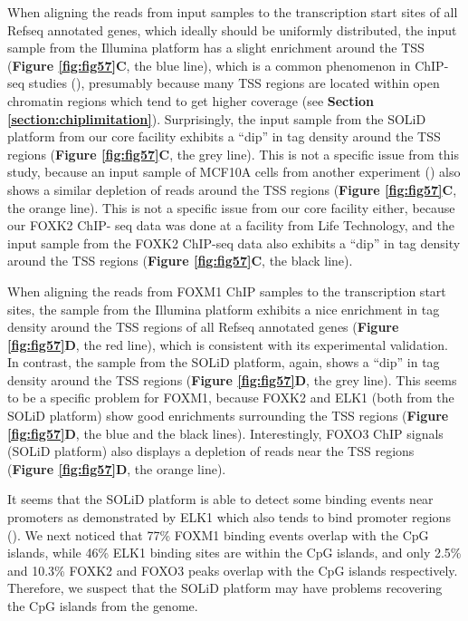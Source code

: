 When aligning the reads from input samples to the transcription start sites of all Refseq annotated genes, which ideally should be uniformly distributed, the input sample from the Illumina platform has a slight enrichment around the TSS (\textbf{Figure \ref{fig:fig57}C}, the blue line), which is a common phenomenon in ChIP-seq studies (\cite{auerbach2009mapping,cheung2011systematic}), presumably because many TSS regions are located within open chromatin regions which tend to get higher coverage (see \textbf{Section \ref{section:chiplimitation}}). Surprisingly, the input sample from the SOLiD platform from our core facility exhibits a \enquote{dip} in tag density around the TSS regions (\textbf{Figure \ref{fig:fig57}C}, the grey line). This is not a specific issue from this study, because an input sample of MCF10A cells from another experiment (\cite{odrowaz2012elk1}) also shows a similar depletion of reads around the TSS regions (\textbf{Figure \ref{fig:fig57}C}, the orange line). This is not a specific issue from our core facility either, because our FOXK2 ChIP- seq data was done at a facility from Life Technology, and the input sample from the FOXK2 ChIP-seq data also exhibits a \enquote{dip} in tag density around the TSS regions (\textbf{Figure \ref{fig:fig57}C}, the black line).

When aligning the reads from FOXM1 ChIP samples to the transcription start sites, the sample from the Illumina platform exhibits a nice enrichment in tag density around the TSS regions of all Refseq annotated genes (\textbf{Figure \ref{fig:fig57}D}, the red line), which is consistent with its experimental validation. In contrast, the sample from the SOLiD platform, again, shows a \enquote{dip} in tag density around the TSS regions (\textbf{Figure \ref{fig:fig57}D}, the grey line). This seems to be a specific problem for FOXM1, because FOXK2 and ELK1 (both from the SOLiD platform) show good enrichments surrounding the TSS regions (\textbf{Figure \ref{fig:fig57}D}, the blue and the black lines). Interestingly, FOXO3 ChIP signals (SOLiD platform) also displays a depletion of reads near the TSS regions (\textbf{Figure \ref{fig:fig57}D}, the orange line).

It seems that the SOLiD platform is able to detect some binding events near promoters as demonstrated by ELK1 which also tends to bind promoter regions (\cite{odrowaz2012elk1}). We next noticed that 77\% FOXM1 binding events overlap with the CpG islands, while 46\% ELK1 binding sites are within the CpG islands, and only 2.5\% and 10.3\% FOXK2 and FOXO3 peaks overlap with the CpG islands respectively. Therefore, we suspect that the SOLiD platform may have problems recovering the CpG islands from the genome.

